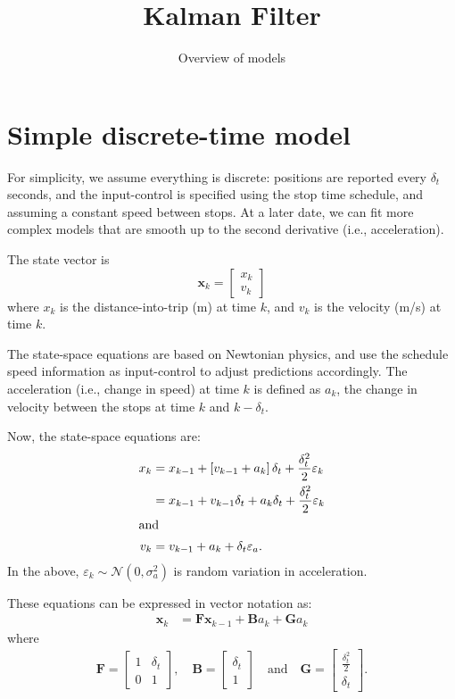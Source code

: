\documentclass[11pt]{article}
\title{Kalman Filter}
\author{Overview of models}
\date{}
\begin{document}
\maketitle



\section{Simple discrete-time model}

For simplicity, we assume everything is discrete: positions are reported every $\delta_t$
seconds, and the input-control is specified using the stop time schedule, and assuming a
constant speed between stops. At a later date, we can fit more complex models that are
smooth up to the second derivative (i.e., acceleration).

The state vector is
\begin{equation}
  \label{eq:state-vector}
  \mathbf{x}_k = 
  \begin{bmatrix}
    x_k \\ v_k
  \end{bmatrix}
\end{equation}
where $x_k$ is the distance-into-trip (m) at time $k$, and $v_k$ is the velocity (m/s) at
time $k$.

The state-space equations are based on Newtonian physics, and use the schedule speed
information as input-control to adjust predictions accordingly.  The acceleration (i.e.,
change in speed) at time $k$ is defined as $a_k$, the change in velocity between the stops at
time $k$ and $k-\delta_t$.

Now, the state-space equations are:
\begin{align}
  \label{eq:state_space_eqns}
  x_k &= x_{k-1} + \left[v_{k-1} + a_k\right] \delta_t + \frac{\delta_t^2}{2} \varepsilon_k \\
  &= x_{k-1} + v_{k-1} \delta_t + a_k \delta_t + \frac{\delta_t^2}{2} \varepsilon_k \\
  \intertext{and}
  v_k &= v_{k-1} + a_k + \delta_t \varepsilon_a.
\end{align}
In the above, $\varepsilon_k \sim \mathcal{N}\left(0,\sigma_a^2\right)$ is random
variation in acceleration.

These equations can be expressed in vector notation as:
\begin{align}
  \label{eq:state_matrix_eqns}
  \mathbf{x}_k &= \mathbf{F} \mathbf{x}_{k-1} + \mathbf{B} a_k + \mathbf{G} a_k
\end{align}
where
\begin{align}
  \mathbf{F} = 
  \begin{bmatrix}
    1 & \delta_t \\
    0 & 1
  \end{bmatrix},
  \quad
  \mathbf{B} =
  \begin{bmatrix}
    \delta_t \\ 1
  \end{bmatrix}
  \quad\text{and}\quad
  \mathbf{G} = 
  \begin{bmatrix}
    \frac{\delta_t^2}{2} \\ \delta_t
  \end{bmatrix}.
\end{align}
\end{document}
